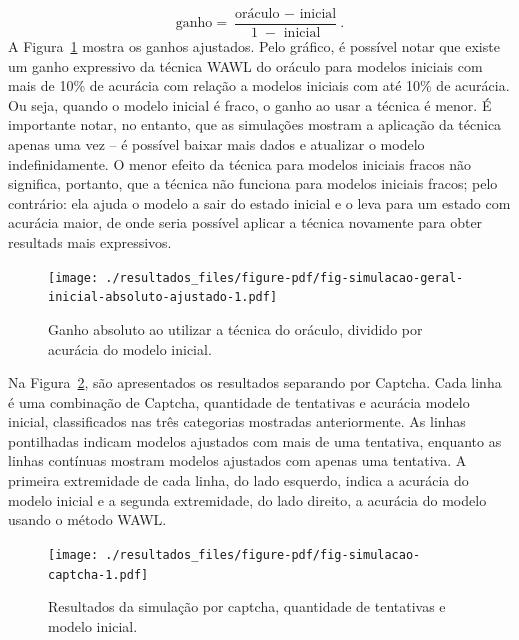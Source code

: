 \documentclass[12pt,twoside,brazilian]{book}
\begin{document}
\[
\text{ganho} = \frac{\text{oráculo } - \text{ inicial}}{1\; - \text{ inicial}}.
\] A Figura~\ref{fig-simulacao-geral-inicial-absoluto-ajustado} mostra
os ganhos ajustados. Pelo gráfico, é possível notar que existe um ganho
expressivo da técnica WAWL do oráculo para modelos iniciais com mais de
10\% de acurácia com relação a modelos iniciais com até 10\% de
acurácia. Ou seja, quando o modelo inicial é fraco, o ganho ao usar a
técnica é menor. É importante notar, no entanto, que as simulações
mostram a aplicação da técnica apenas uma vez -- é possível baixar mais
dados e atualizar o modelo indefinidamente. O menor efeito da técnica
para modelos iniciais fracos não significa, portanto, que a técnica não
funciona para modelos iniciais fracos; pelo contrário: ela ajuda o
modelo a sair do estado inicial e o leva para um estado com acurácia
maior, de onde seria possível aplicar a técnica novamente para obter
resultads mais expressivos.

\begin{figure}

{\centering \texttt{[image: ./resultados\_files/figure-pdf/fig-simulacao-geral-inicial-absoluto-ajustado-1.pdf]}

}

\caption{\label{fig-simulacao-geral-inicial-absoluto-ajustado}Ganho
absoluto ao utilizar a técnica do oráculo, dividido por acurácia do
modelo inicial.}

\end{figure}

Na Figura~\ref{fig-simulacao-captcha}, são apresentados os resultados
separando por Captcha. Cada linha é uma combinação de Captcha,
quantidade de tentativas e acurácia modelo inicial, classificados nas
três categorias mostradas anteriormente. As linhas pontilhadas indicam
modelos ajustados com mais de uma tentativa, enquanto as linhas
contínuas mostram modelos ajustados com apenas uma tentativa. A primeira
extremidade de cada linha, do lado esquerdo, indica a acurácia do modelo
inicial e a segunda extremidade, do lado direito, a acurácia do modelo
usando o método WAWL.

\begin{figure}

{\centering \texttt{[image: ./resultados\_files/figure-pdf/fig-simulacao-captcha-1.pdf]}

}

\caption{\label{fig-simulacao-captcha}Resultados da simulação por
captcha, quantidade de tentativas e modelo inicial.}

\end{figure}
\end{document}
